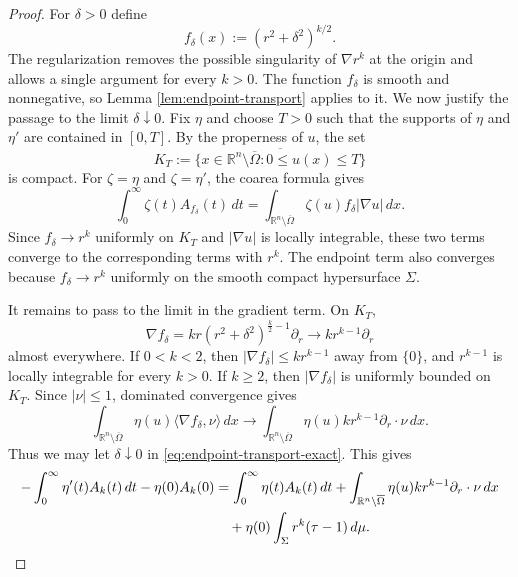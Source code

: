 \documentclass[10pt,a4paper]{amsart}
\numberwithin{equation}{section}
\newcommand{\R}{\mathbb R}
\newcommand{\Om}{\Omega}
\newcommand{\Sig}{\Sigma}
\begin{document}
\begin{proof}
For $\delta>0$ define
\begin{equation*}
    f_\delta(x):=(r^2+\delta^2)^{k/2}.
\end{equation*}
The regularization removes the possible singularity of $\nabla r^k$ at the origin and allows a single argument for every $k>0$.  The function $f_\delta$ is smooth and nonnegative, so Lemma \ref{lem:endpoint-transport} applies to it.  We now justify the passage to the limit $\delta\downarrow0$.  Fix $\eta$ and choose $T>0$ such that the supports of $\eta$ and $\eta'$ are contained in $[0,T]$.  By the properness of $u$, the set
\begin{equation*}
    K_T:=\overline{\{x\in\R^n\setminus\overline\Om:0\leq u(x)\leq T\}}
\end{equation*}
is compact.  For $\zeta=\eta$ and $\zeta=\eta'$, the coarea formula gives
\begin{equation*}
    \int_0^\infty \zeta(t)A_{f_\delta}(t)\,dt
    =\int_{\R^n\setminus\overline\Om}
      \zeta(u)f_\delta|\nabla u|\,dx.
\end{equation*}
Since $f_\delta\to r^k$ uniformly on $K_T$ and $|\nabla u|$ is locally integrable, these two terms converge to the corresponding terms with $r^k$.  The endpoint term also converges because $f_\delta\to r^k$ uniformly on the smooth compact hypersurface $\Sig$.

It remains to pass to the limit in the gradient term.  On $K_T$,
\begin{equation*}
    \nabla f_\delta
    =kr(r^2+\delta^2)^{\frac{k}{2}-1}\partial_r
    \longrightarrow kr^{k-1}\partial_r
\end{equation*}
almost everywhere.  If $0<k<2$, then $|\nabla f_\delta|\leq kr^{k-1}$ away from $\{0\}$, and $r^{k-1}$ is locally integrable for every $k>0$.  If $k\geq2$, then $|\nabla f_\delta|$ is uniformly bounded on $K_T$.  Since $|\nu|\leq1$, dominated convergence gives
\begin{equation*}
    \int_{\R^n\setminus\overline\Om}
      \eta(u)\langle\nabla f_\delta,\nu\rangle\,dx
    \longrightarrow
    \int_{\R^n\setminus\overline\Om}
      \eta(u)kr^{k-1}\partial_r\cdot\nu\,dx.
\end{equation*}
Thus we may let $\delta\downarrow0$ in \eqref{eq:endpoint-transport-exact}. This gives
\begin{align}
    -\int_0^\infty\eta'(t)A_k(t)\,dt-\eta(0)A_k(0)
    &=\int_0^\infty\eta(t)A_k(t)\,dt 
      +\int_{\R^n\setminus\overline\Om}
       \eta(u)kr^{k-1}\partial_r\cdot\nu\,dx \notag\\
    &\quad+\eta(0)\int_\Sig r^k(\tau-1)\,d\mu.\label{eq:Ak-endpoint}
\end{align}


\end{proof}
\end{document}
